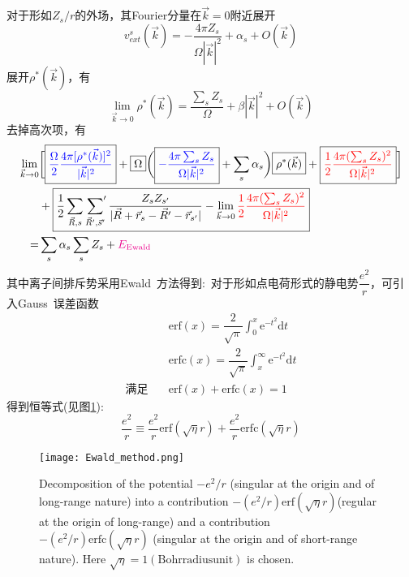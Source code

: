 \documentclass{article}      %
\newcommand{\upcite}[1]{\hspace{0ex}\textsuperscript{\cite{#1}}} %
\begin{document}
对于形如$Z_s/r$的外场，其\textrm{Fourier}分量在$\vec k=0$附近展开
	\begin{equation}
		v_{ext}^s(\vec k)=-\dfrac{4\pi Z_s}{\Omega|\vec k|^2}+\alpha_s+O(\vec k)
		\label{eq:V_ext}
	\end{equation}
展开$\rho^{\ast}(\vec k)$，有
	\begin{equation}
		\lim_{\vec k\rightarrow 0}\rho^{\ast}(\vec k)=\dfrac{\sum_sZ_s}{\Omega}+\beta|\vec k|^2+O(\vec k)
		\label{eq:rho_ext}
	\end{equation}
去掉高次项，有
\begin{equation}
	\begin{aligned}
		\lim_{\vec k\rightarrow 0}&\bigg[\boxed{\textcolor{blue}{\dfrac{\Omega}2\dfrac{4\pi[\rho^{\ast}(\vec k)]^2}{|\vec k|^2}}}+\boxed{\Omega}\bigg(\boxed{\textcolor{blue}{-\dfrac{4\pi\sum_sZ_s}{\Omega|\vec k|^2}}}+\sum_s\alpha_s\bigg)\boxed{\rho^{\ast}(\vec k)}+\boxed{\textcolor{red}{\dfrac12\dfrac{4\pi(\sum_sZ_s)^2}{\Omega|\vec k|^2}}}\bigg]\\
		&+\boxed{\dfrac12\sum_{\vec R,s}\sideset{}{^{\prime}}\sum_{\vec R^{\prime},\vec s^{\prime}}\dfrac{Z_sZ_{s^{\prime}}}{|\vec R+\vec r_s-\vec R^{\prime}-\vec r_{s^{\prime}}|}-\lim_{\vec k\rightarrow0}\textcolor{red}{\dfrac12\dfrac{4\pi(\sum_sZ_s)^2}{\Omega|\vec k|^2}}}\\
		=&\sum_s\alpha_s\sum_sZ_s+\textcolor{magenta}{E_{\mathrm{Ewald}}}
	\end{aligned}
	\label{eq:V_ext_exp2}
\end{equation}
其中离子间排斥势采用\textrm{Ewald~}方法得到\upcite{Born-Huang,R.Martin}:~对于形如点电荷形式的静电势$\dfrac{e^2}r$，可引入\textrm{Gauss~}误差函数\upcite{Grosso-Parravicini}
\begin{equation}
	\begin{aligned}
		&\mathrm{erf}(x)=\dfrac2{\sqrt{\pi}}\int_0^{x}\mathrm{e}^{-t^2}\mathrm{d}t\\
		&\mathrm{erfc}(x)=\dfrac2{\sqrt{\pi}}\int_x^{\infty}\mathrm{e}^{-t^2}\mathrm{d}t\\
		\mbox{满足}\quad&\mathrm{erf}(x)+\mathrm{erfc}(x)=1
	\end{aligned}
	\label{eq:err_fun}
\end{equation}
得到恒等式(见图\ref{Error_Function}):
\begin{equation}
	\dfrac{e^2}r\equiv\dfrac{e^2}r\mathrm{erf}(\sqrt{\eta}r)+\dfrac{e^2}r\mathrm{erfc}(\sqrt{\eta}r)
	\label{eq:err_fun_comp}
\end{equation}
\begin{figure}[h!]
\centering
\vspace*{-0.10in}
\texttt{[image: Ewald\_method.png]}
\caption{\small \textrm{Decomposition of the potential $-e^2/r$ (singular at the origin and of long-range nature) into a contribution $-(e^2/r)\mathrm{erf}(\sqrt{\eta}r)$(regular at the origin of long-range) and a contribution $-(e^2/r)\mathrm{erfc}(\sqrt{\eta}r)$ (singular at the origin and of short-range nature). Here $\sqrt{\eta}=1 (\mathrm{Bohr radius unit})$ is chosen.}\upcite{Grosso-Parravicini}}%
\label{Error_Function}
\end{figure}
\end{document}
